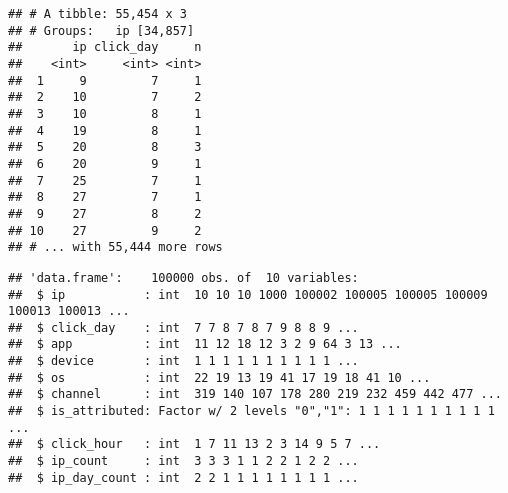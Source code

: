 \documentclass[]{article}
\newenvironment{Shaded}{\begin{snugshade}}{\end{snugshade}}
\newcommand{\CommentTok}[1]{\textcolor[rgb]{0.56,0.35,0.01}{\textit{#1}}}
\newcommand{\DataTypeTok}[1]{\textcolor[rgb]{0.13,0.29,0.53}{#1}}
\newcommand{\KeywordTok}[1]{\textcolor[rgb]{0.13,0.29,0.53}{\textbf{#1}}}
\newcommand{\NormalTok}[1]{#1}
\newcommand{\OperatorTok}[1]{\textcolor[rgb]{0.81,0.36,0.00}{\textbf{#1}}}
\newcommand{\OtherTok}[1]{\textcolor[rgb]{0.56,0.35,0.01}{#1}}
\newcommand{\StringTok}[1]{\textcolor[rgb]{0.31,0.60,0.02}{#1}}
\begin{document}
\begin{verbatim}
## # A tibble: 55,454 x 3
## # Groups:   ip [34,857]
##       ip click_day     n
##    <int>     <int> <int>
##  1     9         7     1
##  2    10         7     2
##  3    10         8     1
##  4    19         8     1
##  5    20         8     3
##  6    20         9     1
##  7    25         7     1
##  8    27         7     1
##  9    27         8     2
## 10    27         9     2
## # ... with 55,444 more rows
\end{verbatim}

\begin{Shaded}
\end{Shaded}

\begin{verbatim}
## 'data.frame':    100000 obs. of  10 variables:
##  $ ip           : int  10 10 10 1000 100002 100005 100005 100009 100013 100013 ...
##  $ click_day    : int  7 7 8 7 8 7 9 8 8 9 ...
##  $ app          : int  11 12 18 12 3 2 9 64 3 13 ...
##  $ device       : int  1 1 1 1 1 1 1 1 1 1 ...
##  $ os           : int  22 19 13 19 41 17 19 18 41 10 ...
##  $ channel      : int  319 140 107 178 280 219 232 459 442 477 ...
##  $ is_attributed: Factor w/ 2 levels "0","1": 1 1 1 1 1 1 1 1 1 1 ...
##  $ click_hour   : int  1 7 11 13 2 3 14 9 5 7 ...
##  $ ip_count     : int  3 3 3 1 1 2 2 1 2 2 ...
##  $ ip_day_count : int  2 2 1 1 1 1 1 1 1 1 ...
\end{verbatim}
\end{document}
